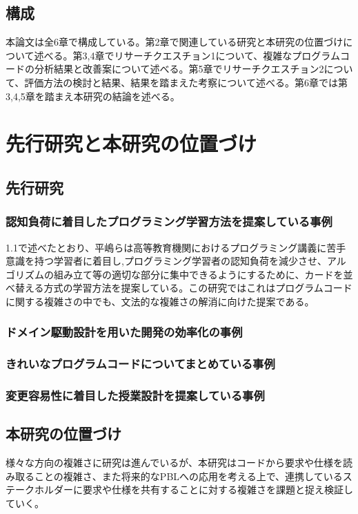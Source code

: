 \documentclass[12pt, a4paper]{jreport}
\begin{document}
\section{構成}
本論文は全6章で構成している。第2章で関連している研究と本研究の位置づけについて述べる。第3,4章でリサーチクエスチョン1について、複雑なプログラムコードの分析結果と改善案について述べる。第5章でリサーチクエスチョン2について、評価方法の検討と結果、結果を踏まえた考察について述べる。第6章では第3,4,5章を踏まえ本研究の結論を述べる。
\chapter{先行研究と本研究の位置づけ}
\section{先行研究}
\subsection{認知負荷に着目したプログラミング学習方法を提案している事例}
1.1で述べたとおり、平嶋ら\cite{haikei}は高等教育機関におけるプログラミング講義に苦手意識を持つ学習者に着目し,プログラミング学習者の認知負荷を減少させ、アルゴリズムの組み立て等の適切な部分に集中できるようにするために、カードを並べ替える方式の学習方法を提案している。この研究ではこれはプログラムコードに関する複雑さの中でも、文法的な複雑さの解消に向けた提案である。
\subsection{ドメイン駆動設計を用いた開発の効率化の事例}

\subsection{きれいなプログラムコードについてまとめている事例}

\subsection{変更容易性に着目した授業設計を提案している事例}

\section{本研究の位置づけ}
様々な方向の複雑さに研究は進んでいるが、本研究はコードから要求や仕様を読み取ることの複雑さ、また将来的なPBLへの応用を考える上で、連携しているステークホルダーに要求や仕様を共有することに対する複雑さを課題と捉え検証していく。
\end{document}
